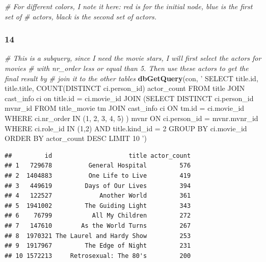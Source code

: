 \documentclass[]{article}
\newenvironment{Shaded}{\begin{snugshade}}{\end{snugshade}}
\newcommand{\KeywordTok}[1]{\textcolor[rgb]{0.13,0.29,0.53}{\textbf{{#1}}}}
\newcommand{\StringTok}[1]{\textcolor[rgb]{0.31,0.60,0.02}{{#1}}}
\newcommand{\CommentTok}[1]{\textcolor[rgb]{0.56,0.35,0.01}{\textit{{#1}}}}
\newcommand{\NormalTok}[1]{{#1}}
\begin{document}
\begin{Shaded}
\begin{Highlighting}[]
\CommentTok{# For different colors, I note it here: red is for the initial node, blue is the first set of }
\CommentTok{# actors, black is the second set of actors.}
\end{Highlighting}
\end{Shaded}

\subsubsection{14}\label{question-14}

\begin{Shaded}
\begin{Highlighting}[]
\CommentTok{# This is a subquery, since I need the movie stars, I will first select the actors for movies}
\CommentTok{# with nr_order less or equal than 5. Then use these actors to get the final result by }
\CommentTok{# join it to the other tables}
\KeywordTok{dbGetQuery}\NormalTok{(con, }\StringTok{'}
\StringTok{           SELECT title.id, title.title, COUNT(DISTINCT ci.person_id) actor_count}
\StringTok{           FROM title JOIN cast_info ci on title.id = ci.movie_id}
\StringTok{              JOIN (SELECT DISTINCT ci.person_id mvnr_id}
\StringTok{                    FROM title_movie tm JOIN cast_info ci ON tm.id = ci.movie_id}
\StringTok{                    WHERE ci.nr_order IN (1, 2, 3, 4, 5)}
\StringTok{                    ) mvnr ON ci.person_id = mvnr.mvnr_id}
\StringTok{           WHERE ci.role_id IN (1,2)}
\StringTok{              AND title.kind_id = 2}
\StringTok{           GROUP BY ci.movie_id}
\StringTok{           ORDER BY actor_count DESC}
\StringTok{           LIMIT 10}
\StringTok{           '}\NormalTok{)}
\end{Highlighting}
\end{Shaded}

\begin{verbatim}
##         id                     title actor_count
## 1   729678          General Hospital         576
## 2  1404883          One Life to Live         419
## 3   449619         Days of Our Lives         394
## 4   122527             Another World         361
## 5  1941002         The Guiding Light         343
## 6    76799           All My Children         272
## 7   147610        As the World Turns         267
## 8  1970321 The Laurel and Hardy Show         253
## 9  1917967         The Edge of Night         231
## 10 1572213     Retrosexual: The 80's         200
\end{verbatim}
\end{document}
